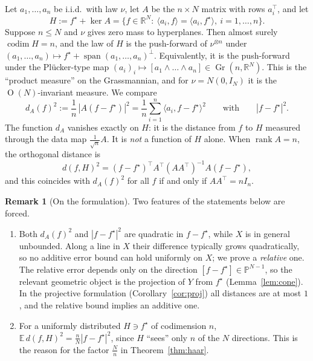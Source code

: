 \documentclass[11pt]{article}
\theoremstyle{definition}
\newtheorem{remark}[theorem]{Remark}
\numberwithin{equation}{section}
\newcommand{\R}{\mathbb{R}}
\newcommand{\PP}{\mathbb{P}}
\newcommand{\E}{\mathbb{E}}
\newcommand{\fs}{f^{\star}}
\DeclareMathOperator{\codim}{codim}
\DeclareMathOperator{\rank}{rank}
\DeclareMathOperator{\Gr}{Gr}
\DeclareMathOperator{\Ort}{O}
\DeclareMathOperator{\spn}{span}
\begin{document}
Let $a_1,\dots,a_n$ be i.i.d.\ with law $\nu$, let $A$ be the $n\times N$ matrix with rows $a_i^\top$, and let
\[
H:=\fs+\ker A=\big\{f\in\R^N:\ \langle a_i,f\rangle=\langle a_i,\fs\rangle,\ i=1,\dots,n\big\}.
\]
Suppose $n\le N$ and $\nu$ gives zero mass to hyperplanes. Then almost surely $\codim H=n$, and the law of $H$ is the push-forward of $\nu^{\otimes n}$ under $(a_1,\dots,a_n)\mapsto\fs+\spn(a_1,\dots,a_n)^\perp$. Equivalently, it is the push-forward under the Pl\"ucker-type map $(a_i)_i\mapsto[a_1\wedge\dots\wedge a_n]\in\Gr(n,\R^N)$. This is the ``product measure'' on the Grassmannian, and for $\nu=N(0,I_N)$ it is the $\Ort(N)$-invariant measure. We compare
\[
d_A(f)^2:=\frac1n\,|A(f-\fs)|^2=\frac1n\sum_{i=1}^n\langle a_i,f-\fs\rangle^2\qquad\text{with}\qquad|f-\fs|^2 .
\]
The function $d_A$ vanishes exactly on $H$: it is the distance from $f$ to $H$ measured through the data map $\frac1{\sqrt n}A$. It is \emph{not} a function of $H$ alone. When $\rank A=n$, the orthogonal distance is
\[
d(f,H)^2=(f-\fs)^\top A^\top(AA^\top)^{-1}A(f-\fs),
\]
and this coincides with $d_A(f)^2$ for all $f$ if and only if $AA^\top=nI_n$.

\begin{remark}[On the formulation]\label{rem:formulation}
Two features of the statements below are forced.
\begin{enumerate}
\item[(i)] Both $d_A(f)^2$ and $|f-\fs|^2$ are quadratic in $f-\fs$, while $X$ is in general unbounded. Along a line in $X$ their difference typically grows quadratically, so no additive error bound can hold uniformly on $X$; we prove a \emph{relative} one. The relative error depends only on the direction $[f-\fs]\in\PP^{N-1}$, so the relevant geometric object is the projection of $Y$ from $\fs$ (Lemma~\ref{lem:cone}). In the projective formulation (Corollary~\ref{cor:proj}) all distances are at most $1$, and the relative bound implies an additive one.
\item[(ii)] For a uniformly distributed $H\ni\fs$ of codimension $n$, $\E\,d(f,H)^2=\frac nN|f-\fs|^2$, since $H$ ``sees'' only $n$ of the $N$ directions. This is the reason for the factor $\frac Nn$ in Theorem~\ref{thm:haar}.
\end{enumerate}
\end{remark}
\end{document}
